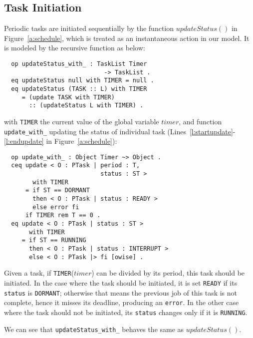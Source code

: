 \documentclass[10pt,journal]{IEEEtran}
\begin{document}
\subsection{Task Initiation}
\label{ss:init}
Periodic tasks are initiated sequentially by the function
$updateStatus()$ in Figure~\ref{a:schedule}, which is treated as an
instantaneous action in our model. It is modeled by the recursive
function as below:
\begin{verbatim}
  op updateStatus_with_ : TaskList Timer 
                            -> TaskList . 
  eq updateStatus null with TIMER = null .
  eq updateStatus (TASK :: L) with TIMER
     = (update TASK with TIMER) 
       :: (updateStatus L with TIMER) .
\end{verbatim}
with \verb|TIMER| the current value of the global variable $timer$,
and function \verb|update_with_| updating the status of individual
task (Lines~\ref{l:startupdate}-\ref{l:endupdate} in
Figure~\ref{a:schedule}):
\begin{verbatim}
  op update_with_ : Object Timer ~> Object .
  ceq update < O : PTask | period : T, 
                           status : ST > 
        with TIMER
      = if ST == DORMANT 
        then < O : PTask | status : READY >
        else error fi
      if TIMER rem T == 0 .
  eq update < O : PTask | status : ST > 
       with TIMER
     = if ST == RUNNING 
       then < O : PTask | status : INTERRUPT >
       else < O : PTask |> fi [owise] .
\end{verbatim}
Given a task, if \verb|TIMER|($timer$) can be divided by its period,
this task should be initiated.  In the case where the task should be
initiated, it is set \verb|READY| if its \verb|status| is
\verb|DORMANT|; otherwise that means the previous job of this task is
not complete, hence it misses its deadline, producing an
\verb|error|. In the other case where the task should not be
initiated, its \verb|status| changes only if it is \verb|RUNNING|.

We can see that \verb|updateStatus_with_| behaves the same as
$updateStatus()$.
\end{document}
